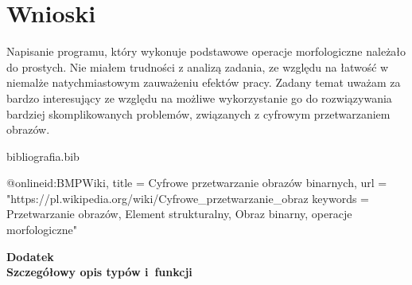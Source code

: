 \documentclass[12pt,a4paper,twoside]{article}
\begin{document}
\clearpage











\section{Wnioski}
Napisanie programu, który wykonuje podstawowe operacje morfologiczne należało do prostych. Nie miałem trudności z analizą zadania, ze względu na łatwość w niemalże natychmiastowym zauważeniu efektów pracy. Zadany temat uważam za bardzo interesujący ze względu na możliwe wykorzystanie go do rozwiązywania bardziej skomplikowanych problemów, związanych z cyfrowym przetwarzaniem obrazów.



\begin{filecontents}{bibliografia.bib}
\begin{thebibliography}


@online{id:BMPWiki,
    title = {Cyfrowe przetwarzanie obrazów binarnych},
    url  = "https://pl.wikipedia.org/wiki/Cyfrowe_przetwarzanie_obraz%
    keywords = Przetwarzanie obrazów, Element strukturalny, Obraz binarny, operacje morfologiczne"
}

\end{thebibliography}



\end{filecontents}





\cleardoublepage

\rule{0cm}{0cm}

\vfill

\begin{center}
\Huge\bfseries Dodatek\\Szczegółowy opis typów i~funkcji\par
\end{center}

\vfill 

\rule{0cm}{0cm}
\end{document}

